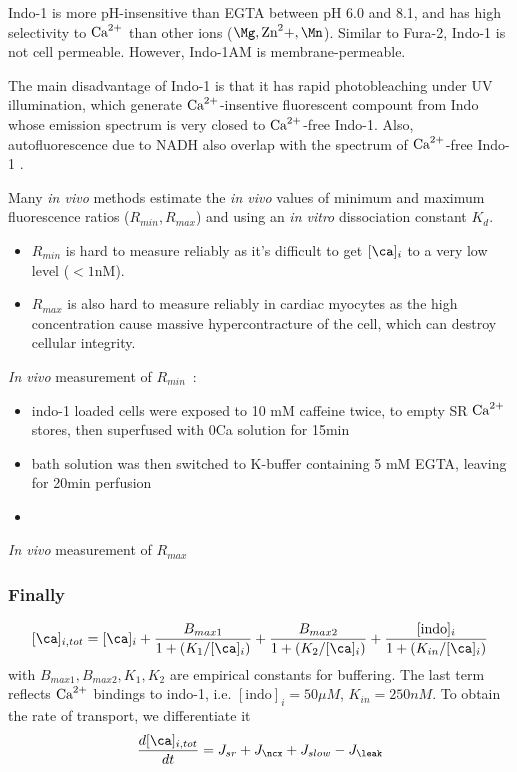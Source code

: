 \begin{framed}
Indo-1 is more pH-insensitive than EGTA between pH 6.0 and 8.1, and has high
selectivity to ${\text{Ca}^{2+}}$ than other ions ($\Mg, \Zn, \Mn$). Similar to Fura-2,
Indo-1 is not cell permeable. However, Indo-1AM is membrane-permeable.
\end{framed}

The main disadvantage of Indo-1 is that it has rapid photobleaching under UV
illumination, which generate ${\text{Ca}^{2+}}$-insentive fluorescent compount from Indo
whose emission spectrum is very closed to ${\text{Ca}^{2+}}$-free Indo-1. Also,
autofluorescence due to NADH also overlap with the spectrum of ${\text{Ca}^{2+}}$-free
Indo-1 \citep{takahashi1999}.


Many {\it in vivo} methods estimate the {\it in vivo} values of
minimum and maximum fluorescence ratios ($R_{min}, R_{max}$) and using
an {\it in vitro} dissociation constant $K_d$.
\begin{itemize}
\item $R_{min}$ is hard to measure reliably as it's difficult to get
  $[\ca]_i$ to a very low level ($< 1$nM).
\item $R_{max}$ is also hard to measure reliably in cardiac myocytes
  as the high concentration cause massive hypercontracture of the
  cell, which can destroy cellular integrity.
\end{itemize}

\begin{framed}
  {\it In vivo} measurement of $R_{min}$~\citep{bassani1995a}:
  \begin{itemize}
  \item indo-1 loaded cells were exposed to 10 mM caffeine twice, to
    empty SR ${\text{Ca}^{2+}}$ stores, then superfused with 0Ca solution for 15min
  \item bath solution was then switched to K-buffer containing 5 mM
    EGTA, leaving for 20min perfusion
  \item
  \end{itemize}
{\it In vivo} measurement of $R_{max}$
\end{framed}


\subsubsection{Finally}
\label{sec:finally}

\begin{equation}
  \label{eq:966}
  [\ca]_{i,tot} = [\ca]_i + \frac{B_{max1}}{1+(K_1/[\ca]_i)}+
  \frac{B_{max2}}{1+(K_2/[\ca]_i)}+ \frac{[\text{indo}]_i}{1+(K_{in}/[\ca]_i)}
\end{equation}
with $B_{max1},B_{max2},K_1,K_2$ are empirical constants for
buffering. The last term reflects ${\text{Ca}^{2+}}$ bindings to indo-1,
i.e. $[\text{indo}]_i=50 \mu M$, $K_{in}=250 nM$. To obtain the rate
of transport, we differentiate it
\begin{equation}
  \label{eq:967}
  \frac{d[\ca]_{i,tot}}{dt} = J_{sr}+J_\ncx+J_{slow}-J_\leak
\end{equation}

